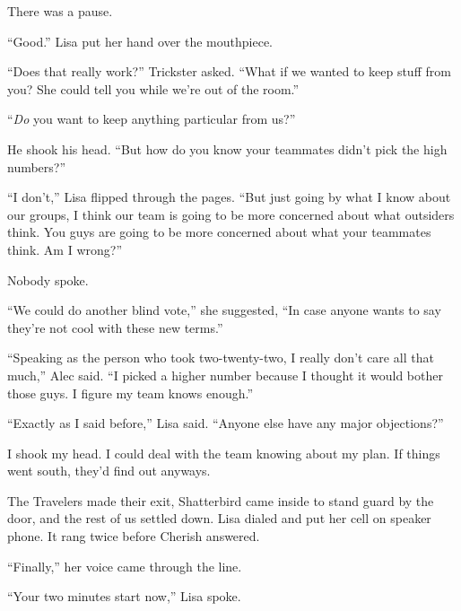 There was a pause.



``Good.''  Lisa put her hand over the mouthpiece.



``Does that really work?''  Trickster asked.  ``What if we wanted to keep stuff from you?  She could tell you while we're out of the room.''



``\emph{Do} you want to keep anything particular from us?''



He shook his head.  ``But how do you know your teammates didn't pick the high numbers?''



``I don't,'' Lisa flipped through the pages.  ``But just going by what I know about our groups, I think our team is going to be more concerned about what outsiders think.  You guys are going to be more concerned about what your teammates think.  Am I wrong?''



Nobody spoke.



``We could do another blind vote,'' she suggested, ``In case anyone wants to say they're not cool with these new terms.''



``Speaking as the person who took two-twenty-two, I really don't care all that much,'' Alec said.  ``I picked a higher number because I thought it would bother those guys.  I figure my team knows enough.''



``Exactly as I said before,'' Lisa said.  ``Anyone else have any major objections?''



I shook my head.  I could deal with the team knowing about my plan.  If things went south, they'd find out anyways.



The Travelers made their exit, Shatterbird came inside to stand guard by the door, and the rest of us settled down.  Lisa dialed and put her cell on speaker phone.  It rang twice before Cherish answered.



``Finally,'' her voice came through the line.



``Your two minutes start now,'' Lisa spoke.



